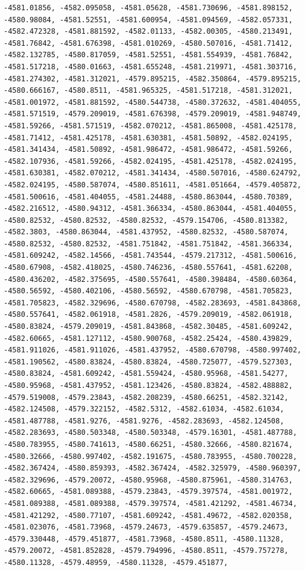 \documentclass[
]{article}
\begin{document}
\begin{verbatim}
-4581.01856, -4582.095058, -4581.05628, -4581.730696, -4581.898152,  -4580.98084, -4581.52551, -4581.600954, -4581.094569, -4582.057331,  -4582.472328, -4581.881592, -4582.01133, -4582.00305, -4580.213491,  -4581.76842, -4581.676398, -4581.010269, -4580.507016, -4581.71412,  -4582.132785, -4580.817059, -4581.52551, -4581.554939, -4581.76842,  -4581.517218, -4580.01663, -4581.655248, -4581.219971, -4581.303716,  -4581.274302, -4581.312021, -4579.895215, -4582.350864, -4579.895215,  -4580.666167, -4580.8511, -4581.965325, -4581.517218, -4581.312021,  -4581.001972, -4581.881592, -4580.544738, -4580.372632, -4581.404055,  -4581.571519, -4579.209019, -4581.676398, -4579.209019, -4581.948749,  -4581.59266, -4581.571519, -4582.070212, -4581.865008, -4581.425178,  -4581.71412, -4581.425178, -4581.630381, -4581.50892, -4582.024195,  -4581.341434, -4581.50892, -4581.986472, -4581.986472, -4581.59266,  -4582.107936, -4581.59266, -4582.024195, -4581.425178, -4582.024195,  -4581.630381, -4582.070212, -4581.341434, -4580.507016, -4580.624792,  -4582.024195, -4580.587074, -4580.851611, -4581.051664, -4579.405872,  -4581.500616, -4581.404055, -4581.24488, -4580.863044, -4580.70389,  -4582.216512, -4580.94312, -4581.366334, -4580.863044, -4581.404055,  -4580.82532, -4580.82532, -4580.82532, -4579.154706, -4580.813382,  -4582.3803, -4580.863044, -4581.437952, -4580.82532, -4580.587074,  -4580.82532, -4580.82532, -4581.751842, -4581.751842, -4581.366334,  -4581.609242, -4582.14566, -4581.743544, -4579.217312, -4581.500616,  -4580.67908, -4582.418025, -4580.746236, -4580.557641, -4581.62208,  -4580.436202, -4582.375695, -4580.557641, -4580.398484, -4580.60364,  -4580.56592, -4580.402106, -4580.56592, -4580.670798, -4581.705823,  -4581.705823, -4582.329696, -4580.670798, -4582.283693, -4581.843868,  -4580.557641, -4582.061918, -4581.2826, -4579.209019, -4582.061918,  -4580.83824, -4579.209019, -4581.843868, -4582.30485, -4581.609242,  -4582.60665, -4581.127112, -4580.900768, -4582.25424, -4580.439829,  -4581.911026, -4581.911026, -4581.437952, -4580.670798, -4580.997402,  -4581.190562, -4580.83824, -4580.83824, -4580.725077, -4579.527303,  -4580.83824, -4581.609242, -4581.559424, -4580.95968, -4581.54277,  -4580.95968, -4581.437952, -4581.123426, -4580.83824, -4582.488882,  -4579.519008, -4579.23843, -4582.208239, -4580.66251, -4582.32142,  -4582.124508, -4579.322152, -4582.5312, -4582.61034, -4582.61034,  -4581.487788, -4581.9276, -4581.9276, -4582.283693, -4582.124508,  -4582.283693, -4580.503348, -4580.503348, -4579.16301, -4581.487788,  -4580.783955, -4580.741613, -4580.66251, -4580.32666, -4580.821674,  -4580.32666, -4580.997402, -4582.191675, -4580.783955, -4580.700228,  -4582.367424, -4580.859393, -4582.367424, -4582.325979, -4580.960397,  -4582.329696, -4579.20072, -4580.95968, -4580.875961, -4580.314763,  -4582.60665, -4581.089388, -4579.23843, -4579.397574, -4581.001972,  -4581.089388, -4581.089388, -4579.397574, -4581.421292, -4581.46734,  -4581.421292, -4580.77107, -4581.609242, -4581.49672, -4582.020358,  -4581.023076, -4581.73968, -4579.24673, -4579.635857, -4579.24673,  -4579.330448, -4579.451877, -4581.73968, -4580.8511, -4580.11328,  -4579.20072, -4581.852828, -4579.794996, -4580.8511, -4579.757278,  -4580.11328, -4579.48959, -4580.11328, -4579.451877, 
\end{verbatim}
\end{document}
